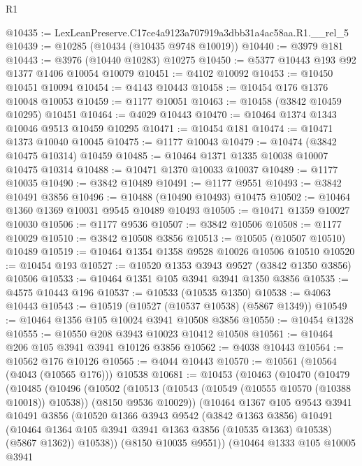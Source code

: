 \begin{lexlean}{R1}
\begin{coremodule}
@10435 := LexLeanPreserve.C17ce4a9123a707919a3dbb31a4ac58aa.R1.__rel_5
@10439 := @10285 (@10434 (@10435 @9748 @10019))
@10440 := @3979 @181
@10443 := @3976 (@10440 @10283) @10275
@10450 := @5377 @10443 @193 @92 @1377 @1406 @10054 @10079
@10451 := @4102 @10092
@10453 := @10450 @10451 @10094
@10454 := @4143 @10443
@10458 := @10454 @176 @1376 @10048 @10053
@10459 := @1177 @10051
@10463 := @10458 (@3842 @10459 @10295) @10451
@10464 := @4029 @10443
@10470 := @10464 @1374 @1343 @10046 @9513 @10459 @10295
@10471 := @10454 @181
@10474 := @10471 @1373 @10040 @10045
@10475 := @1177 @10043
@10479 := @10474 (@3842 @10475 @10314) @10459
@10485 := @10464 @1371 @1335 @10038 @10007 @10475 @10314
@10488 := @10471 @1370 @10033 @10037
@10489 := @1177 @10035
@10490 := @3842 @10489
@10491 := @1177 @9551
@10493 := @3842 @10491 @3856
@10496 := @10488 (@10490 @10493) @10475
@10502 := @10464 @1360 @1369 @10031 @9545 @10489 @10493
@10505 := @10471 @1359 @10027 @10030
@10506 := @1177 @9536
@10507 := @3842 @10506
@10508 := @1177 @10029
@10510 := @3842 @10508 @3856
@10513 := @10505 (@10507 @10510) @10489
@10519 := @10464 @1354 @1358 @9528 @10026 @10506 @10510
@10520 := @10454 @193
@10527 := @10520 @1353 @3943 @9527 (@3842 @1350 @3856) @10506
@10533 := @10464 @1351 @105 @3941 @3941 @1350 @3856
@10535 := @4575 @10443 @196
@10537 := @10533 (@10535 @1350)
@10538 := @4063 @10443
@10543 := @10519 (@10527 (@10537 @10538) (@5867 @1349))
@10549 := @10464 @1356 @105 @10024 @3941 @10508 @3856
@10550 := @10454 @1328
@10555 := @10550 @208 @3943 @10023 @10412 @10508
@10561 := @10464 @206 @105 @3941 @3941 @10126 @3856
@10562 := @4038 @10443
@10564 := @10562 @176 @10126
@10565 := @4044 @10443
@10570 := @10561 (@10564 (@4043 (@10565 @176))) @10538
@10681 := @10453
    (@10463
      (@10470
        (@10479
          (@10485
            (@10496
              (@10502
                (@10513
                  (@10543 (@10549 (@10555 @10570 (@10388 @10018)) @10538))
                  (@8150 @9536 @10029))
                (@10464
                  @1367
                  @105
                  @9543
                  @3941
                  @10491
                  @3856
                  (@10520
                    @1366
                    @3943
                    @9542
                    (@3842 @1363 @3856)
                    @10491
                    (@10464 @1364 @105 @3941 @3941 @1363 @3856 (@10535 @1363) @10538)
                    (@5867 @1362))
                  @10538))
              (@8150 @10035 @9551))
            (@10464
              @1333
              @105
              @10005
              @3941

\end{coremodule}
\end{lexlean}
